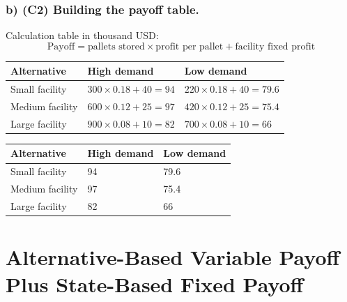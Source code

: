 	
	\subsubsection*{b) \textbf{(C2)} Building the payoff table.}
	\label{subsec:problem11-cold-storage-contracts-c2}
	Calculation table in thousand USD:
	\[
	\text{Payoff}=\text{pallets stored}\times\text{profit per pallet}+\text{facility fixed profit}
	\]
	\begin{center}
		\begin{tabular}{lll}
			\toprule
			Alternative & High demand & Low demand \\
			\midrule
			Small facility & $300 \times 0.18 + 40 = 94$ & $220 \times 0.18 + 40 = 79.6$ \\
			Medium facility & $600 \times 0.12 + 25 = 97$ & $420 \times 0.12 + 25 = 75.4$ \\
			Large facility & $900 \times 0.08 + 10 = 82$ & $700 \times 0.08 + 10 = 66$ \\
			\bottomrule
		\end{tabular}
	\end{center}
	
	\begin{center}
		\begin{tabular}{lll}
			\toprule
			Alternative & High demand & Low demand \\
			\midrule
			Small facility & 94 & 79.6 \\
			Medium facility & 97 & 75.4 \\
			Large facility & 82 & 66 \\
			\bottomrule
		\end{tabular}
	\end{center}
	
	
	\section{Alternative-Based Variable Payoff Plus State-Based Fixed Payoff}
	\label{sec:alternative-based-variable-payoff-plus-state-based-fixed-payoff}
	
	
